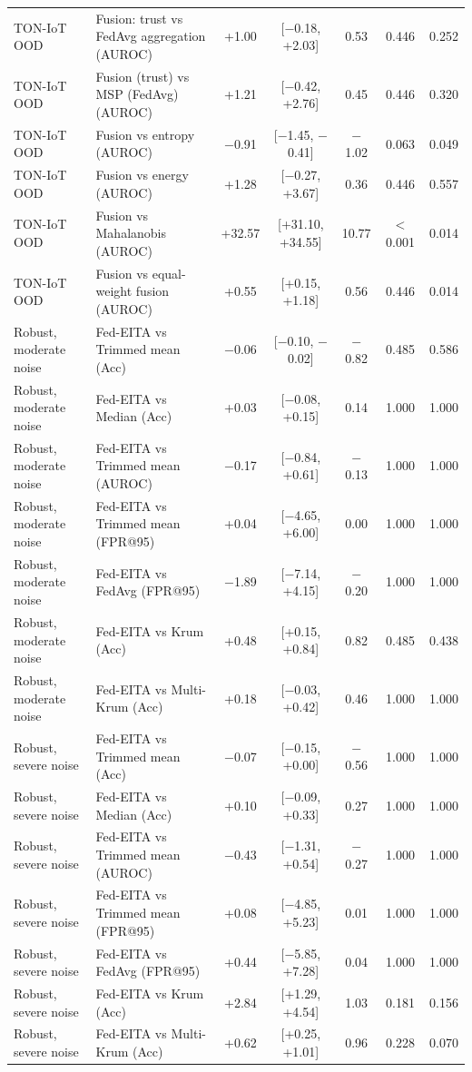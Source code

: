 \documentclass[pdflatex,sn-mathphys-num]{sn-jnl}
\begin{document}
{{\begin{table}[!htbp]
{\begin{tabular}{llccccc}
\midrule
TON-IoT OOD & Fusion: trust vs FedAvg aggregation (AUROC) & +1.00 & [$-$0.18, +2.03] & 0.53 & 0.446 & 0.252 \\
TON-IoT OOD & Fusion (trust) vs MSP (FedAvg) (AUROC) & +1.21 & [$-$0.42, +2.76] & 0.45 & 0.446 & 0.320 \\
TON-IoT OOD & Fusion vs entropy (AUROC) & $-$0.91 & [$-$1.45, $-$0.41] & $-$1.02 & 0.063 & 0.049 \\
TON-IoT OOD & Fusion vs energy (AUROC) & +1.28 & [$-$0.27, +3.67] & 0.36 & 0.446 & 0.557 \\
TON-IoT OOD & Fusion vs Mahalanobis (AUROC) & +32.57 & [+31.10, +34.55] & 10.77 & $<$0.001 & 0.014 \\
TON-IoT OOD & Fusion vs equal-weight fusion (AUROC) & +0.55 & [+0.15, +1.18] & 0.56 & 0.446 & 0.014 \\
\midrule
Robust, moderate noise & Fed-EITA vs Trimmed mean (Acc) & $-$0.06 & [$-$0.10, $-$0.02] & $-$0.82 & 0.485 & 0.586 \\
Robust, moderate noise & Fed-EITA vs Median (Acc) & +0.03 & [$-$0.08, +0.15] & 0.14 & 1.000 & 1.000 \\
Robust, moderate noise & Fed-EITA vs Trimmed mean (AUROC) & $-$0.17 & [$-$0.84, +0.61] & $-$0.13 & 1.000 & 1.000 \\
Robust, moderate noise & Fed-EITA vs Trimmed mean (FPR@95) & +0.04 & [$-$4.65, +6.00] & 0.00 & 1.000 & 1.000 \\
Robust, moderate noise & Fed-EITA vs FedAvg (FPR@95) & $-$1.89 & [$-$7.14, +4.15] & $-$0.20 & 1.000 & 1.000 \\
Robust, moderate noise & Fed-EITA vs Krum (Acc) & +0.48 & [+0.15, +0.84] & 0.82 & 0.485 & 0.438 \\
Robust, moderate noise & Fed-EITA vs Multi-Krum (Acc) & +0.18 & [$-$0.03, +0.42] & 0.46 & 1.000 & 1.000 \\
\midrule
Robust, severe noise & Fed-EITA vs Trimmed mean (Acc) & $-$0.07 & [$-$0.15, +0.00] & $-$0.56 & 1.000 & 1.000 \\
Robust, severe noise & Fed-EITA vs Median (Acc) & +0.10 & [$-$0.09, +0.33] & 0.27 & 1.000 & 1.000 \\
Robust, severe noise & Fed-EITA vs Trimmed mean (AUROC) & $-$0.43 & [$-$1.31, +0.54] & $-$0.27 & 1.000 & 1.000 \\
Robust, severe noise & Fed-EITA vs Trimmed mean (FPR@95) & +0.08 & [$-$4.85, +5.23] & 0.01 & 1.000 & 1.000 \\
Robust, severe noise & Fed-EITA vs FedAvg (FPR@95) & +0.44 & [$-$5.85, +7.28] & 0.04 & 1.000 & 1.000 \\
Robust, severe noise & Fed-EITA vs Krum (Acc) & +2.84 & [+1.29, +4.54] & 1.03 & 0.181 & 0.156 \\
Robust, severe noise & Fed-EITA vs Multi-Krum (Acc) & +0.62 & [+0.25, +1.01] & 0.96 & 0.228 & 0.070 \\
\bottomrule\end{tabular}}
\end{table}

}}
\end{document}

